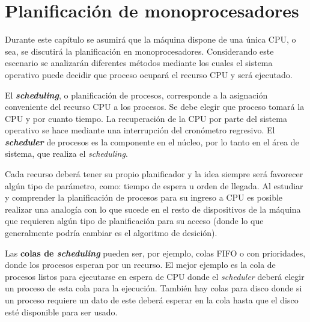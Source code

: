 %
%
%
%

\chapter{Planificación de monoprocesadores}
\label{planificacion_monoprocesadores}
Durante este capítulo se asumirá que la máquina dispone de una única CPU, o sea,
se discutirá la planificación en monoprocesadores. Considerando este escenario
se analizarán diferentes métodos mediante los cuales el sistema operativo puede
decidir que proceso ocupará el recurso CPU y será ejecutado.

El \textbf{\textit{scheduling}}, o planificación de procesos, corresponde a la
asignación conveniente del recurso CPU a los procesos. Se debe elegir que
proceso tomará la CPU y por cuanto tiempo. La recuperación de la CPU por parte
del sistema operativo se hace mediante una interrupción del cronómetro
regresivo. El \textbf{\textit{scheduler}} de procesos es la componente en el
núcleo, por lo tanto en el área de sistema, que realiza el \textit{scheduling}.

Cada recurso deberá tener su propio planificador y la idea siempre será
favorecer algún tipo de parámetro, como: tiempo de espera u orden de llegada.
Al estudiar y comprender la planificación de procesos para su ingreso a CPU es
posible realizar una analogía con lo que sucede en el resto de dispositivos de
la máquina que requieren algún tipo de planificación para su acceso (donde lo
que generalmente podría cambiar es el algoritmo de desición).

Las \textbf{colas de \textit{scheduling}} pueden ser, por ejemplo, colas FIFO o
con prioridades, donde los procesos esperan por un recurso. El mejor ejemplo es
la cola de procesos listos para ejecutarse en espera de CPU donde el
\textit{scheduler} deberá elegir un proceso de esta cola para la ejecución.
También hay colas para disco donde si un proceso requiere un dato de este deberá
esperar en la cola hasta que el disco esté disponible para ser usado.

